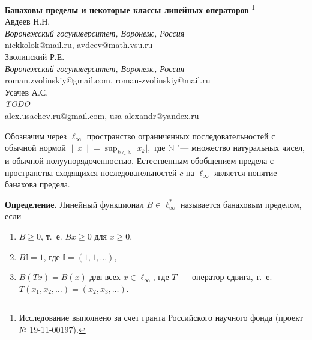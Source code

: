 \documentclass[a4paper,14pt]{article}
\begin{document}
	\pagestyle{fancy}
	\fancyhead{}
	\fancyfoot{}
	\fancyfoot[R]{\footnotesize{}}
	\renewcommand{\footrulewidth}{0.1 mm}

	\begin{center}
		\textbf{Банаховы пределы и некоторые классы линейных операторов}%
		\footnote{Исследование выполнено за счет гранта Российского научного фонда (проект № 19-11-00197).}\\
		\vspace{\baselineskip}
		Авдеев Н.Н.\\
		\emph{Воронежский госуниверситет, Воронеж, Россия}\\nickkolok@mail.ru, avdeev@math.vsu.ru
		\vspace{\baselineskip}\\
		Зволинский Р.Е.\\
		\emph{Воронежский госуниверситет, Воронеж, Россия}\\roman.zvolinskiy@gmail.com, roman-zvolinskiy@mail.ru
		\vspace{\baselineskip}\\
		Усачев А.С.\\
		\emph{TODO}\\alex.usachev.ru@gmail.com, usa-alexandr@yandex.ru
		\vspace{\baselineskip}\\
	\end{center}
	\vspace{\baselineskip}

	\setcounter{equation}{0}
	\setcounter{figure}{0}

	Обозначим через $\ell_\infty$ пространство ограниченных последовательностей с обычной нормой
	$
	\|x\| = \sup_{k\in\mathbb{N}} |x_k|
	,
	$
	где $\mathbb{N}$ "--- множество натуральных чисел, и обычной полуупорядоченностью.
	Естественным обобщением предела с пространства сходящихся последовательностей $c$ на $\ell_\infty$
	является понятие банахова предела.

	\textbf{Определение.}
	Линейный функционал $B\in \ell_\infty^*$ называется банаховым пределом,
	если
	\begin{enumerate}
		\item
		$B\geq0$, т.~е. $Bx \geq 0$ для $x \geq 0$,
		\item
		$B\mathbb{I}=1$, где $\mathbb{I} =(1,1,\ldots)$,
		\item
		$B(Tx)=B(x)$ для всех $x\in \ell_\infty$, где $T$~---
		оператор сдвига, т.~е. $T(x_1,x_2,\ldots)=(x_2,x_3,\ldots)$.
	\end{enumerate}
\end{document}
